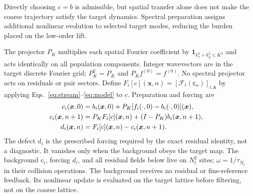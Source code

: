 \documentclass[10pt,letterpaper]{article}
\newcommand{\F}{\mathcal F}\newcommand{\B}{\mathcal B}
\newcommand{\fld}[1]{\mathsf{#1}}
\begin{document}
Directly choosing $c=b$ is admissible, but spatial transfer alone does not make the coarse trajectory satisfy the target dynamics. Spectral preparation assigns additional nonlinear evolution to selected target modes, reducing the burden placed on the low-order lift.

The projector $P_K$ multiplies each spatial Fourier coefficient by $\mathbf1_{k_x^2+k_y^2\leq K^2}$ and acts identically on all population components. Integer wavevectors are in the target discrete Fourier grid; $P_K^2=P_K$ and $P_K f^{(0)}=f^{(0)}$. No spectral projector acts on residuals or pair sectors. Define $F_i[c](\bm x,n)=[\F_t(\fld c_n)]_{i,\bm x}$ by applying Eqs.~\eqref{eq:stream}--\eqref{eq:model} to $c$. Preparation and forcing are
\begin{align}
 c_i(\bm x,0)&=b_i(\bm x,0)+P_K[f_i(\cdot,0)-b_i(\cdot,0)](\bm x),\notag\\
 c_i(\bm x,n+1)&=P_KF_i[c](\bm x,n)+(I-P_K)b_i(\bm x,n+1),\label{eq:prep}\\
 d_i(\bm x,n)&=F_i[c](\bm x,n)-c_i(\bm x,n+1).
\end{align}
The defect $d_i$ is the prescribed forcing required by the exact residual identity, not a diagnostic. It vanishes only when the background obeys the target map. The background $c_i$, forcing $d_i$, and all residual fields below live on $N_t^2$ sites; $\omega=1/\tau_{N_t}$ in their collision operations. The background receives no residual or fine-reference feedback. Its nonlinear update is evaluated on the target lattice before filtering, not on the coarse lattice.
\end{document}

